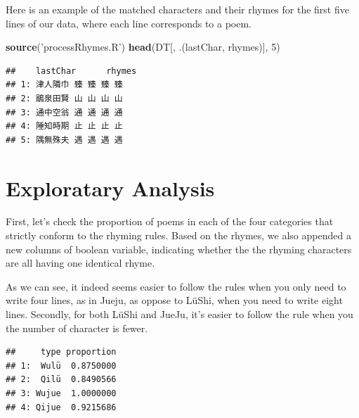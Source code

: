 \documentclass[]{article}
\newenvironment{Shaded}{\begin{snugshade}}{\end{snugshade}}
\newcommand{\DataTypeTok}[1]{\textcolor[rgb]{0.13,0.29,0.53}{#1}}
\newcommand{\DecValTok}[1]{\textcolor[rgb]{0.00,0.00,0.81}{#1}}
\newcommand{\KeywordTok}[1]{\textcolor[rgb]{0.13,0.29,0.53}{\textbf{#1}}}
\newcommand{\NormalTok}[1]{#1}
\newcommand{\OperatorTok}[1]{\textcolor[rgb]{0.81,0.36,0.00}{\textbf{#1}}}
\newcommand{\StringTok}[1]{\textcolor[rgb]{0.31,0.60,0.02}{#1}}
\begin{document}
Here is an example of the matched characters and their rhymes for the
first five lines of our data, where each line corresponds to a poem.

\begin{Shaded}
\begin{Highlighting}[]
\KeywordTok{source}\NormalTok{(}\StringTok{'processRhymes.R'}\NormalTok{)}
\KeywordTok{head}\NormalTok{(DT[, .(lastChar, rhymes)], }\DecValTok{5}\NormalTok{)}
\end{Highlighting}
\end{Shaded}

\begin{verbatim}
##    lastChar      rhymes
## 1: 津人隣巾 臻 臻 臻 臻
## 2: 鵑泉田賢 山 山 山 山
## 3: 通中空翁 通 通 通 通
## 4: 陲知時期 止 止 止 止
## 5: 隅無殊夫 遇 遇 遇 遇
\end{verbatim}

\hypertarget{exploratary-analysis}{%
\section{Exploratary Analysis}\label{exploratary-analysis}}

First, let's check the proportion of poems in each of the four
categories that strictly conform to the rhyming rules. Based on the
rhymes, we also appended a new columns of boolean variable, indicating
whether the the rhyming characters are all having one identical rhyme.

As we can see, it indeed seems easier to follow the rules when you only
need to write four lines, as in Jueju, as oppose to LüShi, when you need
to write eight lines. Secondly, for both LüShi and JueJu, it's easier to
follow the rule when you the number of character is fewer.

\begin{Shaded}
\end{Shaded}

\begin{verbatim}
##     type proportion
## 1:  Wulü  0.8750000
## 2:  Qilü  0.8490566
## 3: Wujue  1.0000000
## 4: Qijue  0.9215686
\end{verbatim}
\end{document}
